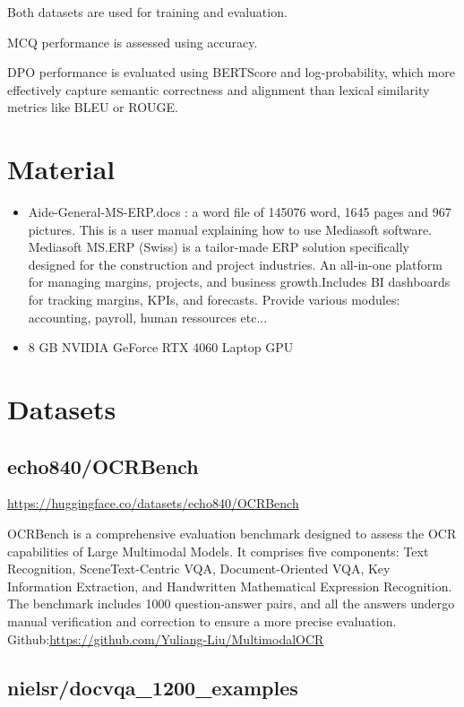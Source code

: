\documentclass[10pt,conference,compsocconf]{IEEEtran}
\begin{document}
Both datasets are used for training and evaluation.

MCQ performance is assessed using accuracy.

DPO performance is evaluated using BERTScore and log-probability, which more effectively capture semantic correctness and alignment than lexical similarity metrics like BLEU or ROUGE.

\section{Material}
\begin{itemize}
\item Aide-General-MS-ERP.docs : a word file of 145076 word, 1645 pages and 967 pictures. This is a user manual explaining how to use Mediasoft software. Mediasoft MS.ERP (Swiss) is a tailor-made ERP solution specifically designed for the construction and project industries. An all-in-one platform for managing margins, projects, and business growth.Includes BI dashboards for tracking margins, KPIs, and forecasts. Provide various modules: accounting, payroll, human ressources etc...
\item 8 GB NVIDIA GeForce RTX 4060 Laptop GPU
\end{itemize}

\section{Datasets}

\subsection{echo840/OCRBench  \cite{Liu_2024} }

\url{https://huggingface.co/datasets/echo840/OCRBench}
\vspace{1cm}

OCRBench is a comprehensive evaluation benchmark designed to assess the OCR capabilities of Large Multimodal Models. It comprises five components: Text Recognition, SceneText-Centric VQA, Document-Oriented VQA, Key Information Extraction, and Handwritten Mathematical Expression Recognition. The benchmark includes 1000 question-answer pairs, and all the answers undergo manual verification and correction to ensure a more precise evaluation.
\\
Github:\url{https://github.com/Yuliang-Liu/MultimodalOCR}


\subsection{nielsr/docvqa\_1200\_examples \cite{mathew2021docvqadatasetvqadocument}}
\end{document}
